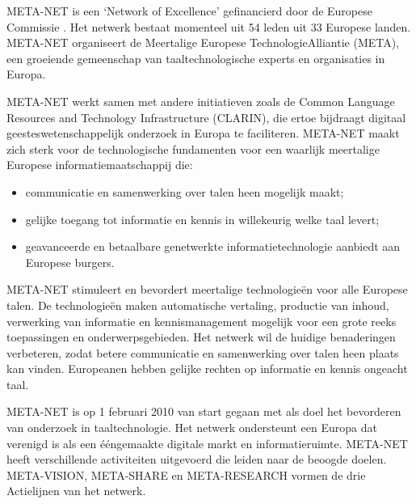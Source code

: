 \documentclass[]{../../metanetpaper}
\begin{document}
\begin{multicols}{2}

    META-NET is een `Network of Excellence' gefinancierd door de Europese Commissie \cite{rehm2011}. Het netwerk bestaat momenteel uit 54 leden uit 33 Europese landen. META-NET organiseert de Meertalige Europese TechnologieAlliantie (META), een groeiende gemeenschap van taaltechnologische experts en organisaties in Europa.

    META-NET werkt samen met andere initiatieven zoals de Common Language Resources and Technology Infrastructure (CLARIN), die ertoe bijdraagt digitaal geesteswetenschappelijk onderzoek in Europa te faciliteren. META-NET maakt zich sterk voor de technologische fundamenten voor een waarlijk meertalige Europese informatiemaatschappij die:
    \begin{itemize}
 	\item communicatie en samenwerking over talen heen mogelijk maakt;
 	\item gelijke toegang tot informatie en kennis in willekeurig welke taal levert;
 	\item geavanceerde en betaalbare genetwerkte informatietechnologie aanbiedt aan Europese burgers.
    \end{itemize}

    META-NET stimuleert en bevordert meertalige technologie{\"e}n voor alle Europese talen. De technologie{\"e}n maken automatische vertaling, productie van inhoud, verwerking van informatie en kennismanagement mogelijk voor een grote reeks toepassingen en onderwerpsgebieden. Het netwerk wil de huidige benaderingen verbeteren, zodat betere communicatie en samenwerking over talen heen plaats kan vinden. Europeanen hebben gelijke rechten op informatie en kennis ongeacht taal.

META-NET is op 1 februari 2010 van start gegaan met als doel het bevorderen van onderzoek in taaltechnologie. Het netwerk ondersteunt een Europa dat verenigd is als een {\'e}{\'e}ngemaakte digitale markt en informatieruimte. META-NET heeft verschillende activiteiten uitgevoerd die leiden naar de beoogde doelen. META-VISION, META-SHARE en META-RESEARCH vormen de drie Actielijnen van het netwerk.


\end{multicols}
\end{document}

